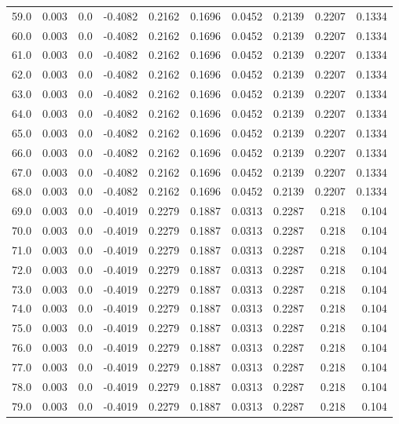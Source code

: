 \begin{longtable}{lrrrrrrrrr}
59.0 & 0.003 & 0.0 & -0.4082 & 0.2162 & 0.1696 & 0.0452 & 0.2139 & 0.2207 & 0.1334 \\
60.0 & 0.003 & 0.0 & -0.4082 & 0.2162 & 0.1696 & 0.0452 & 0.2139 & 0.2207 & 0.1334 \\
61.0 & 0.003 & 0.0 & -0.4082 & 0.2162 & 0.1696 & 0.0452 & 0.2139 & 0.2207 & 0.1334 \\
62.0 & 0.003 & 0.0 & -0.4082 & 0.2162 & 0.1696 & 0.0452 & 0.2139 & 0.2207 & 0.1334 \\
63.0 & 0.003 & 0.0 & -0.4082 & 0.2162 & 0.1696 & 0.0452 & 0.2139 & 0.2207 & 0.1334 \\
64.0 & 0.003 & 0.0 & -0.4082 & 0.2162 & 0.1696 & 0.0452 & 0.2139 & 0.2207 & 0.1334 \\
65.0 & 0.003 & 0.0 & -0.4082 & 0.2162 & 0.1696 & 0.0452 & 0.2139 & 0.2207 & 0.1334 \\
66.0 & 0.003 & 0.0 & -0.4082 & 0.2162 & 0.1696 & 0.0452 & 0.2139 & 0.2207 & 0.1334 \\
67.0 & 0.003 & 0.0 & -0.4082 & 0.2162 & 0.1696 & 0.0452 & 0.2139 & 0.2207 & 0.1334 \\
68.0 & 0.003 & 0.0 & -0.4082 & 0.2162 & 0.1696 & 0.0452 & 0.2139 & 0.2207 & 0.1334 \\
69.0 & 0.003 & 0.0 & -0.4019 & 0.2279 & 0.1887 & 0.0313 & 0.2287 & 0.218 & 0.104 \\
70.0 & 0.003 & 0.0 & -0.4019 & 0.2279 & 0.1887 & 0.0313 & 0.2287 & 0.218 & 0.104 \\
71.0 & 0.003 & 0.0 & -0.4019 & 0.2279 & 0.1887 & 0.0313 & 0.2287 & 0.218 & 0.104 \\
72.0 & 0.003 & 0.0 & -0.4019 & 0.2279 & 0.1887 & 0.0313 & 0.2287 & 0.218 & 0.104 \\
73.0 & 0.003 & 0.0 & -0.4019 & 0.2279 & 0.1887 & 0.0313 & 0.2287 & 0.218 & 0.104 \\
74.0 & 0.003 & 0.0 & -0.4019 & 0.2279 & 0.1887 & 0.0313 & 0.2287 & 0.218 & 0.104 \\
75.0 & 0.003 & 0.0 & -0.4019 & 0.2279 & 0.1887 & 0.0313 & 0.2287 & 0.218 & 0.104 \\
76.0 & 0.003 & 0.0 & -0.4019 & 0.2279 & 0.1887 & 0.0313 & 0.2287 & 0.218 & 0.104 \\
77.0 & 0.003 & 0.0 & -0.4019 & 0.2279 & 0.1887 & 0.0313 & 0.2287 & 0.218 & 0.104 \\
78.0 & 0.003 & 0.0 & -0.4019 & 0.2279 & 0.1887 & 0.0313 & 0.2287 & 0.218 & 0.104 \\
79.0 & 0.003 & 0.0 & -0.4019 & 0.2279 & 0.1887 & 0.0313 & 0.2287 & 0.218 & 0.104 \\

\end{longtable}
